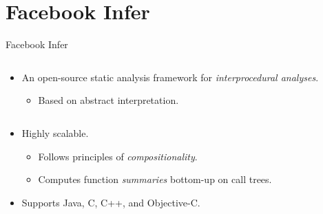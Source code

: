 \documentclass[10pt, hyperref={unicode}, aspectratio=169]{beamer}
\begin{document}
\section{Facebook Infer}
\begin{frame}{Facebook Infer}
    \begin{columns}
        \begin{column}{1 \linewidth}
            \begin{itemize}
                \item
                    An open-source \alert{static analysis framework}
                    for \emph{interprocedural analyses}.

                    \smallskip

                    \begin{itemize}\setlength\itemsep{1em}
                        \item
                            Based on \alert{abstract interpretation}.
                    \end{itemize}
            \end{itemize}
        \end{column}

        \hfill
    \end{columns}

    \begin{columns}
        \begin{column}{.55 \linewidth}
            \begin{itemize}\setlength\itemsep{2em}
                \item
                    \alert{Highly scalable}.

                    \smallskip

                    \begin{itemize}\setlength\itemsep{1em}
                        \item
                            Follows principles of \emph{compositionality}.

                        \item
                            Computes function \emph{summaries} bottom-up
                            on call trees.
                    \end{itemize}

                \item
                    Supports Java, C, C++, and Objective-C.
            \end{itemize}
        \end{column}


\end{columns}
\end{frame}
\end{document}
